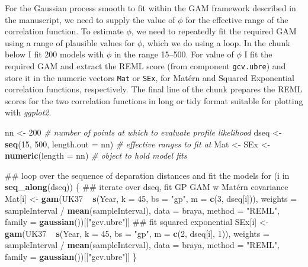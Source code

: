 \documentclass[12pt,]{article}
\newenvironment{Shaded}{\begin{snugshade}}{\end{snugshade}}
\newcommand{\KeywordTok}[1]{\textcolor[rgb]{0.13,0.29,0.53}{\textbf{{#1}}}}
\newcommand{\DataTypeTok}[1]{\textcolor[rgb]{0.13,0.29,0.53}{{#1}}}
\newcommand{\DecValTok}[1]{\textcolor[rgb]{0.00,0.00,0.81}{{#1}}}
\newcommand{\StringTok}[1]{\textcolor[rgb]{0.31,0.60,0.02}{{#1}}}
\newcommand{\CommentTok}[1]{\textcolor[rgb]{0.56,0.35,0.01}{\textit{{#1}}}}
\newcommand{\NormalTok}[1]{{#1}}
\begin{document}
For the Gaussian process smooth to fit within the GAM framework
described in the manuscript, we need to supply the value of \(\phi\) for
the effective range of the correlation function. To estimate \(\phi\),
we need to repeatedly fit the required GAM using a range of plausible
values for \(\phi\), which we do using a loop. In the chunk below I fit
200 models with \(\phi\) in the range 15--500. For value of \(\phi\) I
fit the required GAM and extract the REML score (from component
\texttt{gcv.ubre}) and store it in the numeric vectors \texttt{Mat} or
\texttt{SEx}, for Matérn and Squared Exponential correlation functions,
respectively. The final line of the chunk prepares the REML scores for
the two correlation functions in long or tidy format suitable for
plotting with \emph{ggplot2}.

\begin{Shaded}
\begin{Highlighting}[]
\NormalTok{nn <-}\StringTok{ }\DecValTok{200}    \CommentTok{# number of points at which to evaluate profile likelihood}
\NormalTok{dseq <-}\StringTok{ }\KeywordTok{seq}\NormalTok{(}\DecValTok{15}\NormalTok{, }\DecValTok{500}\NormalTok{, }\DataTypeTok{length.out =} \NormalTok{nn)  }\CommentTok{# effective ranges to fit at}
\NormalTok{Mat <-}\StringTok{ }\NormalTok{SEx <-}\StringTok{ }\KeywordTok{numeric}\NormalTok{(}\DataTypeTok{length =} \NormalTok{nn)     }\CommentTok{# object to hold model fits}

\NormalTok{## loop over the sequence of deparation distances and fit the models}
\NormalTok{for (i in }\KeywordTok{seq_along}\NormalTok{(dseq)) \{ }
    \NormalTok{## iterate over dseq, fit GP GAM w Matérn covariance}
    \NormalTok{Mat[i] <-}\StringTok{ }\KeywordTok{gam}\NormalTok{(UK37 ~}\StringTok{ }\KeywordTok{s}\NormalTok{(Year, }\DataTypeTok{k =} \DecValTok{45}\NormalTok{, }\DataTypeTok{bs =} \StringTok{"gp"}\NormalTok{, }\DataTypeTok{m =} \KeywordTok{c}\NormalTok{(}\DecValTok{3}\NormalTok{, dseq[i])),}
                  \DataTypeTok{weights =} \NormalTok{sampleInterval /}\StringTok{ }\KeywordTok{mean}\NormalTok{(sampleInterval),}
                  \DataTypeTok{data =} \NormalTok{braya, }\DataTypeTok{method =} \StringTok{"REML"}\NormalTok{,}
                  \DataTypeTok{family =} \KeywordTok{gaussian}\NormalTok{())[[}\StringTok{"gcv.ubre"}\NormalTok{]]}
    \NormalTok{## fit squared exponential}
    \NormalTok{SEx[i] <-}\StringTok{ }\KeywordTok{gam}\NormalTok{(UK37 ~}\StringTok{ }\KeywordTok{s}\NormalTok{(Year, }\DataTypeTok{k =} \DecValTok{45}\NormalTok{, }\DataTypeTok{bs =} \StringTok{"gp"}\NormalTok{, }\DataTypeTok{m =} \KeywordTok{c}\NormalTok{(}\DecValTok{2}\NormalTok{, dseq[i], }\DecValTok{1}\NormalTok{)),}
                  \DataTypeTok{weights =} \NormalTok{sampleInterval /}\StringTok{ }\KeywordTok{mean}\NormalTok{(sampleInterval),}
                  \DataTypeTok{data =} \NormalTok{braya, }\DataTypeTok{method =} \StringTok{"REML"}\NormalTok{,}
                  \DataTypeTok{family =} \KeywordTok{gaussian}\NormalTok{())[[}\StringTok{"gcv.ubre"}\NormalTok{]]}
\NormalTok{\}}


\end{Highlighting}
\end{Shaded}
\end{document}
